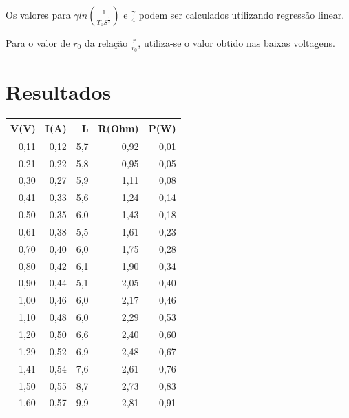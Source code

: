 \documentclass[brazilian,12pt,a4paper,final]{article}
\begin{document}
Os valores para $\gamma ln(\frac{1}{T_0S^\frac{1}{4}})$
e $\frac{\gamma}{4}$ podem ser calculados utilizando regressão linear.

Para o valor de $r_0$ da relação $\frac{r}{r_0}$, utiliza-se o valor obtido 
nas baixas voltagens.

\section{Resultados}

\begin{table}[htbp!]
\centering
\begin{tabular}{|r|r|r|r|r|} 
\hline
V(V)    &       I(A)    &       L       &       R(Ohm)  &       P(W)    \\
\hline
0,11    &       0,12    &       5,7     &       0,92    &       0,01    \\
0,21    &       0,22    &       5,8     &       0,95    &       0,05    \\
0,30    &       0,27    &       5,9     &       1,11    &       0,08    \\
0,41    &       0,33    &       5,6     &       1,24    &       0,14    \\
0,50    &       0,35    &       6,0     &       1,43    &       0,18    \\
0,61    &       0,38    &       5,5     &       1,61    &       0,23    \\
0,70    &       0,40    &       6,0     &       1,75    &       0,28    \\
0,80    &       0,42    &       6,1     &       1,90    &       0,34    \\
0,90    &       0,44    &       5,1     &       2,05    &       0,40    \\
1,00    &       0,46    &       6,0     &       2,17    &       0,46    \\
1,10    &       0,48    &       6,0     &       2,29    &       0,53    \\
1,20    &       0,50    &       6,6     &       2,40    &       0,60    \\
1,29    &       0,52    &       6,9     &       2,48    &       0,67    \\
1,41    &       0,54    &       7,6     &       2,61    &       0,76    \\
1,50    &       0,55    &       8,7     &       2,73    &       0,83    \\
1,60    &       0,57    &       9,9     &       2,81    &       0,91    \\

\end{tabular}
\end{table}
\end{document}
